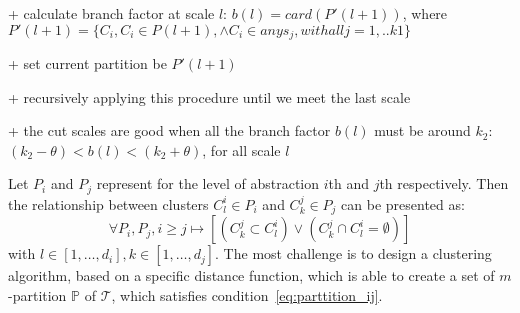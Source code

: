 + calculate branch factor at scale $l$: $b(l) = card(P'(l+1))$, where $P'(l+1) = \{C_i, C_i \in P(l+1), \wedge C_i \in any s_j, with all j =1,..k1\}$

+ set current partition be $P'(l+1)$

+ recursively applying this procedure until we meet the last scale

+ the cut scales are good when all the branch factor $b(l)$ must be around $k_2$: $(k_2 - \theta) < b(l)< (k_2 + \theta)$, for all scale $l$

Let $P_i$ and $P_j$ represent for the level of abstraction $i$th and $j$th respectively. Then the relationship between clusters $C_{l}^{i} \in P_i$ and $C_{k}^{j} \in P_j$ can be presented as: 
\begin{equation}
\label{eq:parttition_ij}
	\forall  P_i, P_j, i \geq j \mapsto [(C_{k}^{j} \subset C_{l}^{i}) \vee (C_{k}^{j} \cap  C_{l}^{i} = \emptyset)]    
\end{equation}
with $l \in [1, \ldots, d_i],k \in [1, \ldots, d_j]$. The most challenge is to design a clustering algorithm, based on a specific distance function, which is able to create a set of $m$-partition $\mathbb{P}$ of $\mathcal{T}$, which satisfies condition~\ref{eq:parttition_ij}. 
